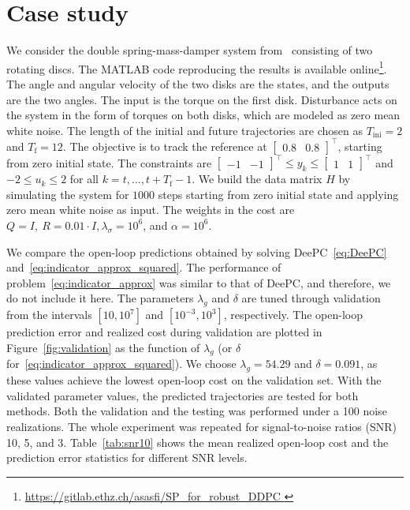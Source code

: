 \documentclass[letterpaper, 10 pt, conference]{ieeeconf}
\begin{document}
\section{Case study} \label{sec:case_study}
We consider the double spring-mass-damper system from~\cite{kerz2023data} consisting of two rotating discs.
The MATLAB code reproducing the results is available online\footnote{\url{https://gitlab.ethz.ch/asasfi/SP_for_robust_DDPC
}}.
The angle and angular velocity of the two disks are the states, and the outputs are the two angles.
The input is the torque on the first disk. 
Disturbance acts on the system in the form of torques on both disks, which are modeled as zero mean white noise.
The length of the initial and future trajectories are chosen as $T_\mathrm{ini} = 2$ and $T_\mathrm{f} = 12$.
The objective is to track the reference at $\begin{bmatrix} 0.8 & 0.8\end{bmatrix}^\top$, starting from zero initial state.
The constraints are $\begin{bmatrix}-1&-1\end{bmatrix}^\top \leq y_k \leq \begin{bmatrix}1&1\end{bmatrix}^\top$ and $-2\leq u_k \leq 2$ for all $k=t,\dots,t+T_\mathrm{f}-1$.
We build the data matrix $H$ by simulating the system for $1000$ steps starting from zero initial state and applying zero mean white noise as input.
The weights in the cost are $Q = I,~R = 0.01\cdot I, \lambda_\sigma = 10^6$, and $\alpha=10^6$.


We compare the open-loop predictions obtained by solving \gls{DeePC}~\eqref{eq:DeePC} and~\eqref{eq:indicator_approx_squared}.
The performance of problem~\eqref{eq:indicator_approx} was similar to that of \gls{DeePC}, and therefore, we do not include it here.
The parameters $\lambda_g$ and $\delta$ are tuned through validation from the intervals $[10,10^7]$ and $[10^{-3},10^3]$, respectively.
The open-loop prediction error and realized cost during validation are plotted in Figure~\ref{fig:validation} as the function of $\lambda_g$ (or $\delta$ for~\eqref{eq:indicator_approx_squared}).
We choose $\lambda_g = 54.29$ and $\delta = 0.091$, as these values achieve the lowest open-loop cost on the validation set.
With the validated parameter values, the predicted trajectories are tested for both methods.
Both the validation and the testing was performed under a 100 noise realizations.
The whole experiment was repeated for signal-to-noise ratios (SNR) 10, 5, and 3.
Table~\ref{tab:snr10} shows the mean realized open-loop cost and the prediction error statistics for different SNR levels.
\end{document}

